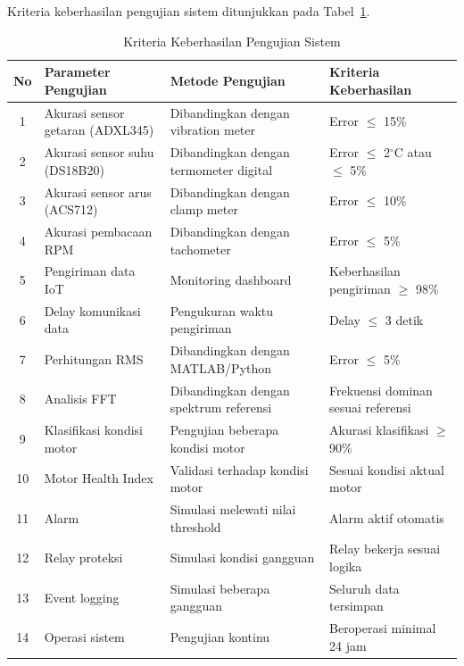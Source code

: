 \documentclass{elsinta}
\begin{document}
Kriteria keberhasilan pengujian sistem ditunjukkan pada Tabel~\ref{tab:kriteria_pengujian}.

\begin{table}[H]
\centering
\caption{Kriteria Keberhasilan Pengujian Sistem}
\label{tab:kriteria_pengujian}

\begin{tabular}{|c|p{4.5cm}|p{4.2cm}|p{4cm}|}
\hline
\textbf{No} &
\centering\textbf{Parameter Pengujian} &
\centering\textbf{Metode Pengujian} &
\centering\arraybackslash\textbf{Kriteria Keberhasilan}\\
\hline

1 &
Akurasi sensor getaran (ADXL345) &
Dibandingkan dengan vibration meter &
Error $\leq$ 15\%\\
\hline

2 &
Akurasi sensor suhu (DS18B20) &
Dibandingkan dengan termometer digital &
Error $\leq$ 2$^\circ$C atau $\leq$ 5\%\\
\hline

3 &
Akurasi sensor arus (ACS712) &
Dibandingkan dengan clamp meter &
Error $\leq$ 10\%\\
\hline

4 &
Akurasi pembacaan RPM &
Dibandingkan dengan tachometer &
Error $\leq$ 5\%\\
\hline

5 &
Pengiriman data IoT &
Monitoring dashboard &
Keberhasilan pengiriman $\geq$ 98\%\\
\hline

6 &
Delay komunikasi data &
Pengukuran waktu pengiriman &
Delay $\leq$ 3 detik\\
\hline

7 &
Perhitungan RMS &
Dibandingkan dengan MATLAB/Python &
Error $\leq$ 5\%\\
\hline

8 &
Analisis FFT &
Dibandingkan dengan spektrum referensi &
Frekuensi dominan sesuai referensi\\
\hline

9 &
Klasifikasi kondisi motor &
Pengujian beberapa kondisi motor &
Akurasi klasifikasi $\geq$ 90\%\\
\hline

10 &
Motor Health Index &
Validasi terhadap kondisi motor &
Sesuai kondisi aktual motor\\
\hline

11 &
Alarm &
Simulasi melewati nilai threshold &
Alarm aktif otomatis\\
\hline

12 &
Relay proteksi &
Simulasi kondisi gangguan &
Relay bekerja sesuai logika\\
\hline

13 &
Event logging &
Simulasi beberapa gangguan &
Seluruh data tersimpan\\
\hline

14 &
Operasi sistem &
Pengujian kontinu &
Beroperasi minimal 24 jam\\
\hline

\end{tabular}
\end{table}
\end{document}
